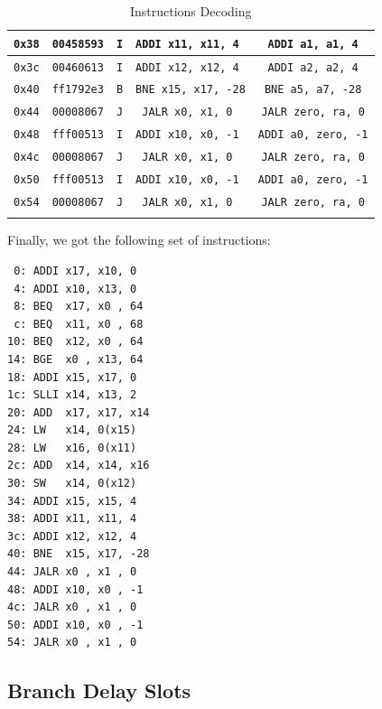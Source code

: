 \documentclass[a4paper,12pt]{article}
\begin{document}
\begin{longtable}{|c|c|c|c|c|}
\texttt{0x38} & \texttt{00458593} & \texttt{I} & \texttt{ADDI x11, x11, 4  }  & \texttt{ADDI a1, a1, 4} \\ \hline
\texttt{0x3c} & \texttt{00460613} & \texttt{I} & \texttt{ADDI x12, x12, 4  }  & \texttt{ADDI a2, a2, 4} \\ \hline
\texttt{0x40} & \texttt{ff1792e3} & \texttt{B} & \texttt{BNE  x15, x17, -28}  & \texttt{BNE  a5, a7, -28} \\ \hline
\texttt{0x44} & \texttt{00008067} & \texttt{J} & \texttt{JALR x0, x1, 0  }  & \texttt{JALR zero, ra, 0} \\ \hline
\texttt{0x48} & \texttt{fff00513} & \texttt{I} & \texttt{ADDI x10, x0, -1 }  & \texttt{ADDI a0, zero, -1} \\ \hline
\texttt{0x4c} & \texttt{00008067} & \texttt{J} & \texttt{JALR x0, x1, 0  }  & \texttt{JALR zero, ra, 0} \\ \hline
\texttt{0x50} & \texttt{fff00513} & \texttt{I} & \texttt{ADDI x10, x0, -1 }  & \texttt{ADDI a0, zero, -1} \\ \hline
\texttt{0x54} & \texttt{00008067} & \texttt{J} & \texttt{JALR x0, x1, 0  }  & \texttt{JALR zero, ra, 0} \\ \hline
\caption{Instructions Decoding}
\end{longtable}
\label{tab:instructions-decoding}


Finally, we got the following set of instructions:
\begin{verbatim}
 0: ADDI x17, x10, 0 
 4: ADDI x10, x13, 0
 8: BEQ  x17, x0 , 64
 c: BEQ  x11, x0 , 68
10: BEQ  x12, x0 , 64
14: BGE  x0 , x13, 64
18: ADDI x15, x17, 0
1c: SLLI x14, x13, 2
20: ADD  x17, x17, x14
24: LW   x14, 0(x15)
28: LW   x16, 0(x11)
2c: ADD  x14, x14, x16
30: SW   x14, 0(x12)
34: ADDI x15, x15, 4
38: ADDI x11, x11, 4
3c: ADDI x12, x12, 4
40: BNE  x15, x17, -28
44: JALR x0 , x1 , 0
48: ADDI x10, x0 , -1
4c: JALR x0 , x1 , 0
50: ADDI x10, x0 , -1
54: JALR x0 , x1 , 0
\end{verbatim}
\subsection{Branch Delay Slots}
\end{document}
